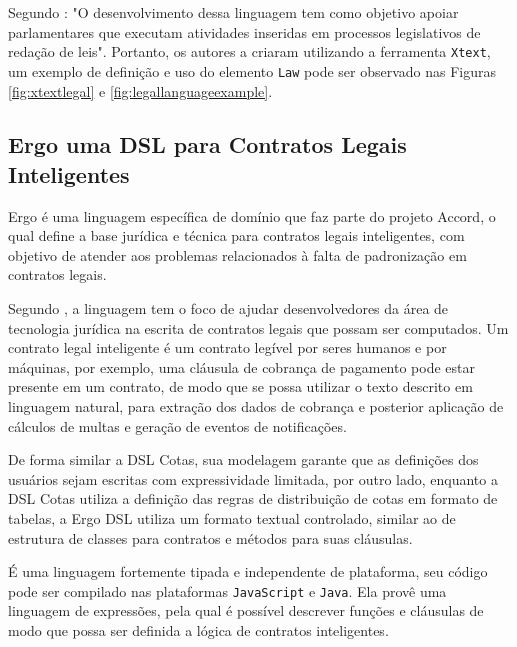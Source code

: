 Segundo : "O desenvolvimento dessa linguagem tem como objetivo apoiar parlamentares que executam atividades inseridas em processos legislativos de redação de leis". Portanto, os autores a criaram utilizando a ferramenta \texttt{Xtext}, um exemplo de definição e uso do elemento \texttt{Law} pode ser observado nas Figuras \ref{fig:xtextlegal} e \ref{fig:legallanguageexample}.








\newpage
\subsection{Ergo uma DSL para Contratos Legais Inteligentes}
\label{ergo}

Ergo é uma linguagem específica de domínio que faz parte do projeto Accord, o qual define a base jurídica e técnica para contratos legais inteligentes, com objetivo de atender aos problemas relacionados à falta de padronização em contratos legais. 

Segundo , a linguagem tem o foco de ajudar desenvolvedores da área de tecnologia jurídica na escrita de contratos legais que possam ser computados. Um contrato legal inteligente é um contrato legível por seres humanos e por máquinas, por exemplo, uma cláusula de cobrança de pagamento pode estar presente em um contrato, de modo que se possa utilizar o texto descrito em linguagem natural, para extração dos dados de cobrança e posterior aplicação de cálculos de multas e geração de eventos de notificações. 

De forma similar a DSL Cotas, sua modelagem garante que as definições dos usuários sejam escritas com expressividade limitada, por outro lado, enquanto a DSL Cotas utiliza a definição das regras de distribuição de cotas em formato de tabelas, a Ergo DSL utiliza um formato textual controlado, similar ao de estrutura de classes para contratos e métodos para suas cláusulas.

É uma linguagem fortemente tipada e independente de plataforma, seu código pode ser compilado nas plataformas \texttt{JavaScript} e \texttt{Java}. Ela provê uma linguagem de expressões, pela qual é possível descrever funções e cláusulas de modo que possa ser definida a lógica de contratos inteligentes. 

